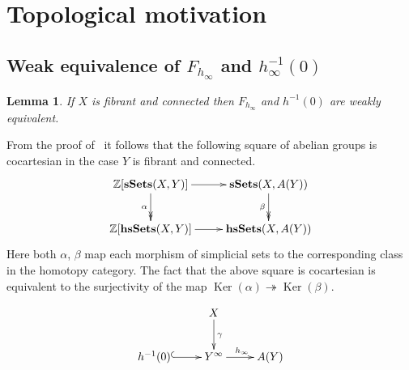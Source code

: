 \documentclass[oneside, 12pt]{amsart}
\theoremstyle{plain}
\numberwithin{equation}{section}
\newtheorem{lemma}{Lemma}
\numberwithin{lemma}{section}
\newtheorem{cor}[lemma]{Corollary}
\theoremstyle{remark}
\theoremstyle{definition}
\newcommand{\catname}[1]{{\normalfont\textbf{#1}}}
\DeclareMathOperator{\HH}{H}
\DeclareMathOperator{\Ker}{Ker}
\newcommand{\ZZ}{\mathbb{Z}}
\begin{document}
\begin{comment}
 To construct the inverse map $\psi\colon H_n(\Lambda^2G) \to HQ_n(G)$ it suffices to check that $c_n(u, u) = 1$.
 But this follows from~\eqref{H00}--\eqref{H0}:
 \[c_n(u, u) = c_n(u, u^{-1}) = h_{nj}(u) \cdot h_{nj}(u^{-1}) \cdot h_{nj}(1)^{-1} = 1. \qedhere\] 
\end{proof}

Thus we obtain the following result.
\begin{cor}
  For $n\geq 3$ the group $Q_n(G)$ is a central extension of $G \wr S_n$ isomorphic to $H_n(\Lambda^2G)\rtimes S_n$.
  The kernel of $\mu$ is isomorphic to $\HH_2(G, \mathbb{Z})$.  
\end{cor}
\end{comment}


\section{Topological motivation} \label{sec:topo-prelim}
\subsection{Weak equivalence of $F_{h_\infty}$ and $h_\infty^{-1}(0)$} \label{sec:topo-weak-equiv}

\begin{lemma} If $X$ is fibrant and connected then $F_{h_\infty}$ and $h^{-1}(0)$ are weakly equivalent. \end{lemma}
From the proof of~\cite[Lemma~10.1]{Po17} it follows that the following square of abelian groups is cocartesian in the case $Y$ is fibrant and connected.
\begin{equation} \xymatrix{ \ZZ[\catname{sSets}(X, Y)] \ar[r]  \ar@{->>}_{\alpha}[d] & \catname{sSets}(X, A(Y)) \ar@{->>}_{\beta}[d]  \\
                            \ZZ[\catname{hsSets}(X, Y)] \ar[r] & \catname{hsSets}(X, A(Y))  } 
\label{eq:podkorytov-square} \end{equation}
Here both $\alpha$, $\beta$ map each morphism of simplicial sets to the corresponding class in the homotopy category.
The fact that the above square is cocartesian is equivalent to the surjectivity of the map $\Ker(\alpha)\twoheadrightarrow\Ker(\beta)$.

\begin{equation} \xymatrix{                            & X  \ar[d]^\gamma             &     \\
                            h^{-1}(0)  \ar@{^{(}->}[r] & Y^\infty  \ar[r]^{h_\infty}  & A(Y) } \end{equation}
 
\end{document}
